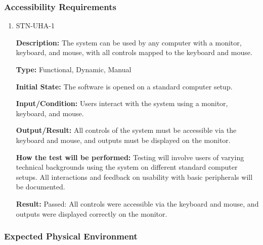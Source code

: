 \documentclass[12pt, titlepage]{article}
\begin{document}
\subsubsection{Accessibility Requirements}

\begin{enumerate}

\item{STN-UHA-1\\}

\textbf{Description:} The system can be used by any computer with a monitor, keyboard, and mouse, with all controls mapped to the keyboard and mouse.

\textbf{Type:} Functional, Dynamic, Manual

\textbf{Initial State:} The software is opened on a standard computer setup.

\textbf{Input/Condition:} Users interact with the system using a monitor, keyboard, and mouse.

\textbf{Output/Result:} All controls of the system must be accessible via the keyboard and mouse, and outputs must be displayed on the monitor.

\textbf{How the test will be performed:} Testing will involve users of varying technical backgrounds using the system on different standard computer setups. All interactions and feedback on usability with basic peripherals will be documented.

\textbf{Result:} Passed: All controls were accessible via the keyboard and mouse, and outputs were displayed correctly on the monitor.

\end{enumerate}

\subsubsection{Expected Physical Environment}
\end{document}
